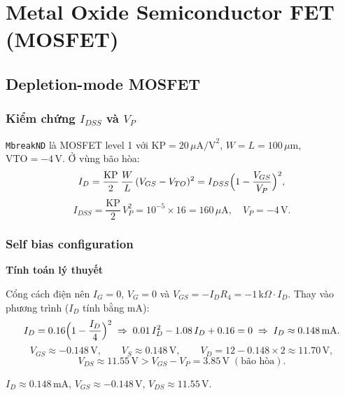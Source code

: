 \section{Metal Oxide Semiconductor FET (MOSFET)}\label{sec:mosfet}

\subsection{Depletion-mode MOSFET \bonus}\label{sec:dfet}

\subsubsection*{Kiểm chứng $I_{DSS}$ và $V_P$}
\texttt{MbreakND} là MOSFET level 1 với $\text{KP} = 20\,\mu\text{A/V}^2$, $W = L = 100\,\mu\text{m}$, $\text{VTO} = -4\,\text{V}$. Ở vùng bão hòa:
\[
I_D = \frac{\text{KP}}{2}\,\frac{W}{L}\,(V_{GS} - V_{TO})^2 = I_{DSS}\Bigl(1 - \frac{V_{GS}}{V_P}\Bigr)^2,
\]
\[
I_{DSS} = \frac{\text{KP}}{2}\,V_P^2 = 10^{-5}\times 16 = 160\,\mu\text{A},\quad V_P = -4\,\text{V}.
\]
\simresult
{}

\subsubsection*{Self bias configuration}

\par\medskip\noindent\textbf{Tính toán lý thuyết}\par\smallskip
Cổng cách điện nên $I_G = 0$, $V_G = 0$ và $V_{GS} = -I_D R_4 = -1\,\text{k}\Omega \cdot I_D$. Thay vào phương trình ($I_D$ tính bằng mA):
\[
I_D = 0.16\Bigl(1 - \frac{I_D}{4}\Bigr)^2
\;\Rightarrow\; 0.01\,I_D^2 - 1.08\,I_D + 0.16 = 0
\;\Rightarrow\; I_D \approx 0.148\,\text{mA}.
\]
\[
V_{GS} \approx -0.148\,\text{V},\qquad
V_S \approx 0.148\,\text{V},\qquad
V_D = 12 - 0.148 \times 2 \approx 11.70\,\text{V},
\]
\[
V_{DS} \approx 11.55\,\text{V} > V_{GS} - V_P = 3.85\,\text{V}\;(\text{bão hòa}).
\]

\begin{dapsobox}
$I_D \approx 0.148\,\text{mA}$, \quad $V_{GS} \approx -0.148\,\text{V}$, \quad $V_{DS} \approx 11.55\,\text{V}$.
\end{dapsobox}

